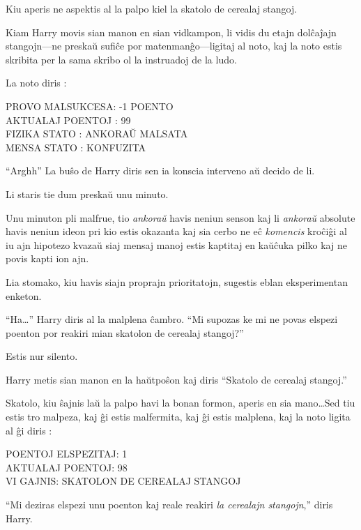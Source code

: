 Kiu aperis ne aspektis al la palpo kiel la skatolo de cerealaj stangoj.

Kiam Harry movis sian manon en sian vidkampon, li vidis du etajn
dolĉaĵajn stangojn—ne preskaŭ sufiĉe por matenmanĝo—ligitaj al noto, kaj
la noto estis skribita per la sama skribo ol la instruadoj de la ludo.

La noto diris :
\medskip

\begin{center}
  PROVO MALSUKCESA: -1 POENTO\\
  AKTUALAJ POENTOJ : 99\\
  FIZIKA STATO : ANKORAŬ MALSATA\\
  MENSA STATO : KONFUZITA\\
\end{center}

\medskip

``Arghh'' La buŝo de Harry diris sen ia konscia interveno aŭ decido de
li.

Li staris tie dum preskaŭ unu minuto.

Unu minuton pli malfrue, tio \emph{ankoraŭ} havis neniun senson kaj li
\emph{ankoraŭ} absolute havis neniun ideon pri kio estis okazanta kaj
sia cerbo ne eĉ \emph{komencis} kroĉiĝi al iu ajn hipotezo kvazaŭ
siaj mensaj manoj estis kaptitaj en kaŭĉuka pilko kaj ne povis
kapti ion ajn.

Lia stomako, kiu havis siajn proprajn prioritatojn, sugestis eblan
eksperimentan enketon.

``Ha\ldots'' Harry diris al la malplena ĉambro. ``Mi supozas ke mi ne povas
elspezi poenton por reakiri mian skatolon de cerealaj stangoj?''

Estis nur silento.

Harry metis sian manon en la haŭtpoŝon kaj diris ``Skatolo de cerealaj stangoj.''

Skatolo, kiu ŝajnis laŭ la palpo havi la bonan formon, aperis en sia
mano\ldots Sed tiu estis tro malpeza, kaj ĝi estis malfermita, kaj ĝi
estis malplena, kaj la noto ligita al ĝi diris :

\medskip
\begin{center}
  POENTOJ ELSPEZITAJ: 1\\
  AKTUALAJ POENTOJ: 98\\
  VI GAJNIS: SKATOLON DE CEREALAJ STANGOJ\\
\end{center}

``Mi deziras elspezi unu poenton kaj reale reakiri \emph{la cerealajn
stangojn},'' diris Harry.

